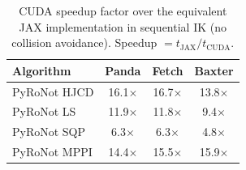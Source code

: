 \begin{table}[t]
\centering
\caption{CUDA speedup factor over the equivalent JAX implementation in sequential IK (no collision avoidance). Speedup $= t_{\text{JAX}} / t_{\text{CUDA}}$.}
\label{tab:ik_cuda_speedup}
\small
\begin{tabular}{lccc}
\toprule
\textbf{Algorithm} & \textbf{Panda} & \textbf{Fetch} & \textbf{Baxter} \\
\midrule
PyRoNot HJCD & 16.1$\times$ & 16.7$\times$ & 13.8$\times$ \\
PyRoNot LS & 11.9$\times$ & 11.8$\times$ & 9.4$\times$ \\
PyRoNot SQP & 6.3$\times$ & 6.3$\times$ & 4.8$\times$ \\
PyRoNot MPPI & 14.4$\times$ & 15.5$\times$ & 15.9$\times$ \\
\bottomrule
\end{tabular}
\end{table}